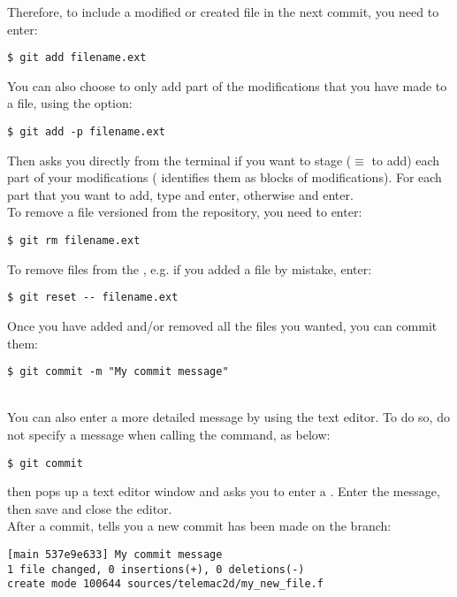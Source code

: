 Therefore, to include a modified or created file in the next commit, you need
to enter:
\begin{lstlisting}
$ git add filename.ext
\end{lstlisting}
You can also choose to only add part of the modifications that you have made to
a file, using the  option:
\begin{lstlisting}
$ git add -p filename.ext
\end{lstlisting}
Then  asks you directly from the terminal if you want to stage
($\equiv$ to add) each part of your modifications ( identifies them
as blocks of modifications). For each part that you want to add, type
 and enter, otherwise  and enter.\\

To remove a file versioned from the repository, you need to enter:
\begin{lstlisting}
$ git rm filename.ext
\end{lstlisting}

To remove files from the , e.g. if you added a file by
mistake, enter:
\begin{lstlisting}
$ git reset -- filename.ext
\end{lstlisting}

Once you have added and/or removed all the files you wanted, you can commit
them:
\begin{lstlisting}
$ git commit -m "My commit message"
\end{lstlisting}

\\

You can also enter a more detailed message by using the text editor. To do so,
do not specify a message when calling the  command, as below:
\begin{lstlisting}
$ git commit
\end{lstlisting}
 then pops up a text editor window and asks you to enter a
. Enter the message, then save and close the
editor.\\

After a commit,  tells you a new commit has been made on the branch:
\begin{footnotesize}
\begin{lstlisting}
[main 537e9e633] My commit message
1 file changed, 0 insertions(+), 0 deletions(-)
create mode 100644 sources/telemac2d/my_new_file.f
\end{lstlisting}
\end{footnotesize}

